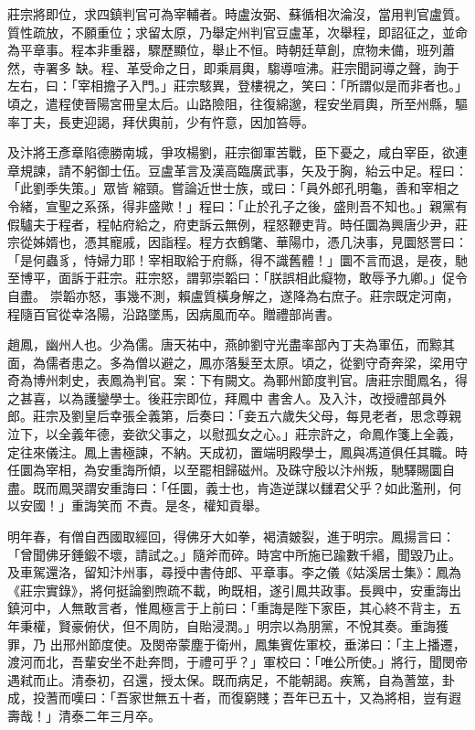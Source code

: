 \begin{pinyinscope}
 莊宗將即位，求四鎮判官可為宰輔者。時盧汝弼、蘇循相次淪沒，當用判官盧質。質性疏放，不願重位；求留太原，乃舉定州判官豆盧革，次舉程，即詔征之，並命為平章事。程本非重器，驟歷顯位，舉止不恒。時朝廷草創，庶物未備，班列蕭然，寺署多
 缺。程、革受命之日，即乘肩輿，騶導喧沸。莊宗聞訶導之聲，詢于左右，曰：「宰相擔子入門。」莊宗駭異，登樓視之，笑曰：「所謂似是而非者也。」頃之，遣程使晉陽宮冊皇太后。山路險阻，往復綿邈，程安坐肩輿，所至州縣，驅率丁夫，長吏迎謁，拜伏輿前，少有忤意，因加笞辱。



 及汴將王彥章陷德勝南城，爭攻楊劉，莊宗御軍苦戰，臣下憂之，咸白宰臣，欲連章規諫，請不躬御士伍。豆盧革言及漢高臨廣武事，矢及于胸，紿云中足。程曰：「此劉季失策。」眾皆
 縮頸。嘗論近世士族，或曰：「員外郎孔明龜，善和宰相之令緒，宣聖之系孫，得非盛歟！」程曰：「止於孔子之後，盛則吾不知也。」親黨有假驢夫于程者，程帖府給之，府吏訴云無例，程怒鞭吏背。時任圜為興唐少尹，莊宗從姊婿也，憑其寵戚，因詣程。程方衣鶴氅、華陽巾，憑几決事，見圜怒詈曰：「是何蟲豸，恃婦力耶！宰相取給于府縣，得不識舊體！」圜不言而退，是夜，馳至博平，面訴于莊宗。莊宗怒，謂郭崇韜曰：「朕誤相此癡物，敢辱予九卿。」促令自盡。
 崇韜亦怒，事幾不測，賴盧質橫身解之，遂降為右庶子。莊宗既定河南，程隨百官從幸洛陽，沿路墜馬，因病風而卒。贈禮部尚書。



 趙鳳，幽州人也。少為儒。唐天祐中，燕帥劉守光盡率部內丁夫為軍伍，而黥其面，為儒者患之。多為僧以避之，鳳亦落髮至太原。頃之，從劉守奇奔梁，梁用守奇為博州刺史，表鳳為判官。案：下有闕文。為鄆州節度判官。唐莊宗聞鳳名，得之甚喜，以為護鑾學士。後莊宗即位，拜鳳中
 書舍人。及入汴，改授禮部員外郎。莊宗及劉皇后幸張全義第，后奏曰：「妾五六歲失父母，每見老者，思念尊親泣下，以全義年德，妾欲父事之，以慰孤女之心。」莊宗許之，命鳳作箋上全義，定往來儀注。鳳上書極諫，不納。天成初，置端明殿學士，鳳與馮道俱任其職。時任圜為宰相，為安重誨所傾，以至罷相歸磁州。及硃守殷以汴州叛，馳驛賜圜自盡。既而鳳哭謂安重誨曰：「任圜，義士也，肯造逆謀以讎君父乎？如此濫刑，何以安國！」重誨笑而
 不責。是冬，權知貢舉。



 明年春，有僧自西國取經回，得佛牙大如拳，褐漬皴裂，進于明宗。鳳揚言曰：「曾聞佛牙錘鍛不壞，請試之。」隨斧而碎。時宮中所施已踰數千緡，聞毀乃止。及車駕還洛，留知汴州事，尋授中書侍郎、平章事。李之儀《姑溪居士集》：鳳為《莊宗實錄》，將何挺論劉煦疏不載，昫既相，遂引鳳共政事。長興中，安重誨出鎮河中，人無敢言者，惟鳳極言于上前曰：「重誨是陛下家臣，其心終不背主，五年秉權，賢豪俯伏，但不周防，自貽浸潤。」明宗以為朋黨，不悅其奏。重誨獲罪，乃
 出邢州節度使。及閔帝蒙塵于衛州，鳳集賓佐軍校，垂涕曰：「主上播遷，渡河而北，吾輩安坐不赴奔問，于禮可乎？」軍校曰：「唯公所使。」將行，聞閔帝遇弒而止。清泰初，召還，授太保。既而病足，不能朝謁。疾篤，自為蓍筮，卦成，投蓍而嘆曰：「吾家世無五十者，而復窮賤；吾年已五十，又為將相，豈有遐壽哉！」清泰二年三月卒。




\end{pinyinscope}
